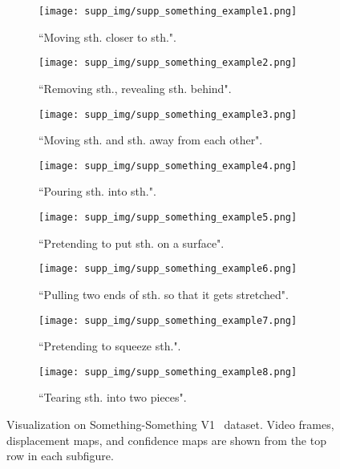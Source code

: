 \documentclass[runningheads]{llncs}
\begin{document}
\clearpage
\begin{figure*}[t]
    \centering
    \begin{subfigure}[t]{0.48\columnwidth}
    \texttt{[image: supp\_img/supp\_something\_example1.png]}
    \caption{``Moving sth. closer to sth.".}
    \label{fig:s3a}
    \end{subfigure}
    \begin{subfigure}[t]{0.48\columnwidth}
    \texttt{[image: supp\_img/supp\_something\_example2.png]}
    \caption{``Removing sth., revealing sth. behind".}
    \label{fig:s3b}
    \end{subfigure}
    \begin{subfigure}[t]{0.48\columnwidth}
    \texttt{[image: supp\_img/supp\_something\_example3.png]}
    \caption{``Moving sth. and sth. away from each other".}
    \label{fig:s3c}
    \end{subfigure}
    \begin{subfigure}[t]{0.48\columnwidth}
    \texttt{[image: supp\_img/supp\_something\_example4.png]}
    \caption{``Pouring sth. into sth.".}
    \label{fig:s3d}
    \end{subfigure}
    \begin{subfigure}[t]{0.48\columnwidth}
    \texttt{[image: supp\_img/supp\_something\_example5.png]}
    \caption{``Pretending to put sth. on a surface".}
    \label{fig:s3e}
    \end{subfigure}
    \begin{subfigure}[t]{0.48\columnwidth}
    \texttt{[image: supp\_img/supp\_something\_example6.png]}
    \caption{``Pulling two ends of sth. so that it gets stretched".}
    \label{fig:s3f}
    \end{subfigure}
    \begin{subfigure}[t]{0.48\columnwidth}
    \texttt{[image: supp\_img/supp\_something\_example7.png]}
    \caption{``Pretending to squeeze sth.".}
    \label{fig:s3g}
    \end{subfigure}
    \begin{subfigure}[t]{0.48\columnwidth}
    \texttt{[image: supp\_img/supp\_something\_example8.png]}
    \caption{``Tearing sth. into two pieces".}
    \label{fig:s3h}
    \end{subfigure}
\caption{Visualization on Something-Something V1~\cite{goyal2017something} dataset. Video frames, displacement maps, and confidence maps are shown from the top row in each subfigure.} \label{fig:s3}
\end{figure*}
\end{document}
